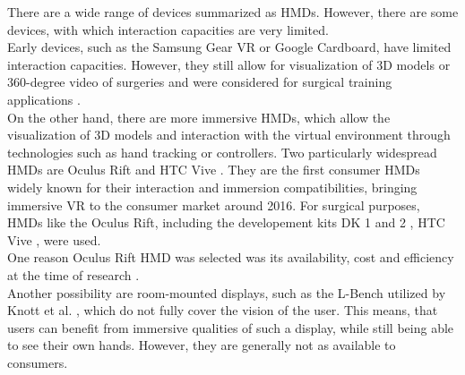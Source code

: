 There are a wide range of devices summarized as HMDs.
However, there are some devices, with which interaction capacities are very limited.
\\ Early devices, such as the Samsung Gear VR or Google Cardboard, have limited interaction capacities.
However, they still allow for visualization of 3D models or 360-degree video of surgeries and were considered for surgical training applications \cite{sararit2017vr, gomez2019techniques}.
\\ On the other hand, there are more immersive HMDs, which allow the visualization of 3D models and interaction with the virtual environment 
through technologies such as hand tracking or controllers.
Two particularly widespread HMDs are Oculus Rift \cite{OculusRift} and HTC Vive \cite{Vive}.
They are the first consumer HMDs widely known for their interaction and immersion compatibilities, bringing immersive VR to the consumer market around 2016.
For surgical purposes, HMDs like the Oculus Rift, including the developement kits DK 1 and 2 \cite{Parham.2019, Pulijala.2017,Sampogna.2017}, HTC 
Vive \cite{.2017, Barber.2020}, were used.
\\ One reason Oculus Rift HMD was selected was its availability, cost and efficiency at the time of research \cite{Pulijala.2017}.
\\ Another possibility are room-mounted displays, such 
as the L-Bench utilized by Knott et al. \cite{RN69}, which do not fully
cover the vision of the user. This means, that users can 
benefit from immersive qualities of such a display, while 
still being able to see their own hands. However,
they are generally not as available to consumers.